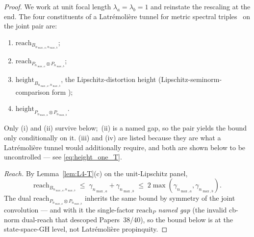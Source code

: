 \documentclass[11pt,a4paper]{article}
\theoremstyle{plain}
\theoremstyle{definition}
\newcommand{\nmaxa}{n_{\max,a}}
\newcommand{\nmaxb}{n_{\max,b}}
\begin{document}
\begin{proof}
We work at unit focal length $\lambda_a = \lambda_b = 1$ and reinstate
the rescaling at the end. The four constituents of a Latr\'emoli\`ere
tunnel for metric spectral triples~\cite{latremoliere_metric_st_2017}
on the joint pair are:
\begin{enumerate}\setlength{\itemsep}{2pt}
\item[(i)] $\mathrm{reach}_{B_{\nmaxa, \nmaxb}}$;
\item[(ii)] $\mathrm{reach}_{P_{\nmaxa} \otimes P_{\nmaxb}}$;
\item[(iii)] $\mathrm{height}_{B_{\nmaxa, \nmaxb}}$, the
Lipschitz-distortion height (Lipschitz-seminorm-comparison form
\cite[Remark~3.8]{loutey_paper38});
\item[(iv)] $\mathrm{height}_{P_{\nmaxa} \otimes P_{\nmaxb}}$.
\end{enumerate}
Only (i) and (ii) survive below;\ (ii) is a named gap, so the pair
yields the bound only conditionally on it. (iii) and (iv) are listed
because they are what a Latr\'emoli\`ere tunnel would additionally
require, and both are shown below to be uncontrolled --- see
\eqref{eq:height_one_T}.

\emph{Reach.} By Lemma~\ref{lem:L4-T}(c) on the unit-Lipschitz panel,
\begin{equation*}
\mathrm{reach}_{B_{\nmaxa, \nmaxb}}
\;\le\; \gamma_{\nmaxa} + \gamma_{\nmaxb}
\;\le\; 2 \max(\gamma_{\nmaxa}, \gamma_{\nmaxb}).
\end{equation*}
The dual $\mathrm{reach}_{P_{\nmaxa} \otimes P_{\nmaxb}}$ inherits the
same bound by symmetry of the joint convolution --- and with it the
single-factor $\mathrm{reach}_P$ \emph{named gap} (the invalid cb-norm
dual-reach that descoped Papers~38/40), so the bound below is at the
state-space-GH level, not Latr\'emoli\`ere propinquity.


\end{proof}
\end{document}
